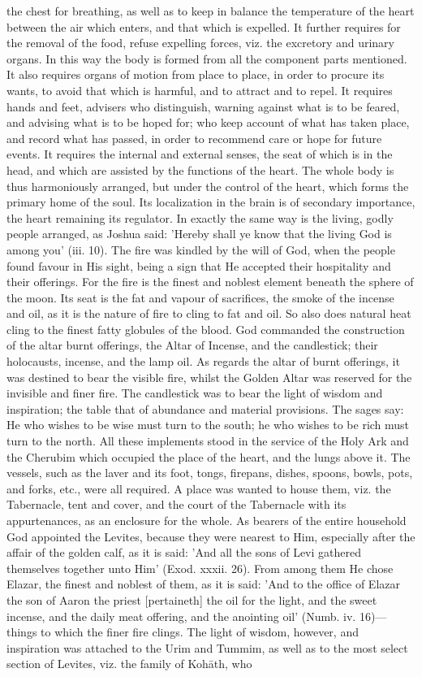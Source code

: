 \documentclass[12pt]{article}
\begin{document}
the chest for breathing, as well as to keep in balance the temperature of the heart between the air which enters, and that which is expelled. It further requires for the removal of the food, refuse expelling forces, viz. the excretory and urinary organs. In this way the body is formed from all the component parts mentioned. It also requires organs of motion from place to place, in order to procure its wants, to avoid that which is harmful, and to attract and to repel. It requires hands and feet, advisers who distinguish, warning against what is to be feared, and advising what is to be hoped for; who keep account of what has taken place, and record what has passed, in order to recommend care or hope for future events. It requires the internal and external senses, the seat of which is in the head, and which are assisted by the functions of the heart. The whole body is thus harmoniously arranged, but under the control of the heart, which forms the primary home of the soul. Its localization in the brain is of secondary importance, the heart remaining its regulator. In exactly the same way is the living, godly people arranged, as Joshua said: 'Hereby shall ye know that the living God is among you' (iii. 10). The fire was kindled by the will of God, when the people found favour in His sight, being a sign that He accepted their hospitality and their offerings. For the fire is the finest and noblest element beneath the sphere of the moon. Its seat is the fat and vapour of sacrifices, the smoke of the incense and oil, as it is the nature of fire to cling to fat and oil. So also does natural heat cling to the finest fatty globules of the blood. God commanded the construction of the altar burnt offerings, the Altar of Incense, and the candlestick; their holocausts, incense, and the lamp oil. As regards the altar of burnt offerings, it was destined to bear the visible fire, whilst the Golden Altar was reserved for the invisible and finer fire. The candlestick was to bear the light of wisdom and inspiration; the table that of abundance and material provisions. The sages say: He who wishes to be wise must turn to the south; he who wishes to be rich must turn to the north. All these implements stood in the service of the Holy Ark and the Cherubim which occupied the place of the heart, and the lungs above it. The vessels, such as the laver and its foot, tongs, firepans, dishes, spoons, bowls, pots, and forks, etc., were all required. A place was wanted to house them, viz. the Tabernacle, tent and cover, and the court of the Tabernacle with its appurtenances, as an enclosure for the whole. As bearers of the entire household God appointed the Levites, because they were nearest to Him, especially after the affair of the golden calf, as it is said: 'And all the sons of Levi gathered themselves together unto Him' (Exod. xxxii. 26). From among them He chose Elazar, the finest and noblest of them, as it is said: 'And to the office of Elazar the son of Aaron the priest [pertaineth] the oil for the light, and the sweet incense, and the daily meat offering, and the anointing oil' (Numb. iv. 16)---things to which the finer fire clings. The light of wisdom, however, and inspiration was attached to the Urim and Tummim, as well as to the most select section of Levites, viz. the family of Kohāth, who 
\end{document}
